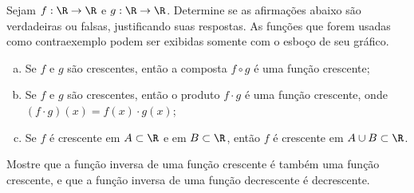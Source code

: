 \begin{exercise}
Sejam $f: \R \to \R $ e $g: \R \to \R$. Determine se as
afirmações abaixo são verdadeiras ou falsas, justificando suas
respostas. As funções que forem usadas como contraexemplo podem ser
exibidas somente com o esboço de seu gráfico.
\begin{enumerate}[(a)]
  \item Se $f$ e $g$ são crescentes, então a composta $f \circ g$ é uma função crescente;
  \item Se $f$ e $g$ são crescentes, então o produto $f\cdot g$ é
  uma função crescente, onde $(f \cdot g)(x) = f(x) \cdot g(x)$;
  \item Se $f$ é crescente em $A \subset \R$ e em $B \subset \R$, então $f$ é crescente em $A \cup B \subset \R$.
\end{enumerate}
\end{exercise}

\begin{exercise}
Mostre que a função inversa de uma função crescente é também uma
função crescente, e que a função inversa de uma função decrescente é
decrescente.
\end{exercise}